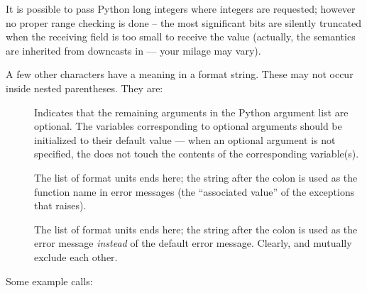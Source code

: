 \documentclass[twoside,openright]{report}
\begin{document}
It is possible to pass Python long integers where integers are
requested; however no proper range checking is done -- the most
significant bits are silently truncated when the receiving field is
too small to receive the value (actually, the semantics are inherited
from downcasts in \C{} --- your milage may vary).

A few other characters have a meaning in a format string.  These may
not occur inside nested parentheses.  They are:

\begin{description}

\item[\samp{|}]
Indicates that the remaining arguments in the Python argument list are
optional.  The \C{} variables corresponding to optional arguments should
be initialized to their default value --- when an optional argument is
not specified, the  does not touch the contents
of the corresponding \C{} variable(s).

\item[\samp{:}]
The list of format units ends here; the string after the colon is used
as the function name in error messages (the ``associated value'' of
the exceptions that  raises).

\item[\samp{;}]
The list of format units ends here; the string after the colon is used
as the error message \emph{instead} of the default error message.
Clearly, \samp{:} and \samp{;} mutually exclude each other.

\end{description}

Some example calls:
\end{document}
